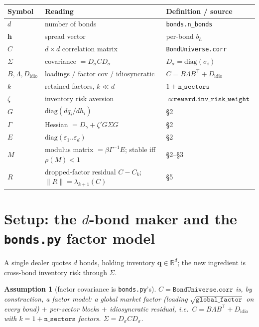 \documentclass[11pt]{article}
\newtheorem{assumption}{Assumption}
\newcommand{\eps}{\varepsilon}
\newcommand{\code}[1]{\texttt{#1}}
\newcommand{\Gam}{\Gamma}
\newcommand{\Sig}{\Sigma}
\newcommand{\Mmat}{M}
\newcommand{\diag}{\mathrm{diag}}
\newcommand{\bh}{\bm{h}}
\newcommand{\bq}{\bm{q}}
\begin{document}
\begin{center}
\begin{tabular}{@{}lll@{}}
\toprule
Symbol & Reading & Definition / source \\
\midrule
$d$ & number of bonds & \code{bonds.n\_bonds} \\
$\bh$ & spread vector & per-bond $b_h$ \\
$C$ & $d\times d$ correlation matrix & \code{BondUniverse.corr} \\
$\Sig$ & covariance $=D_\sigma C D_\sigma$ & $D_\sigma=\diag(\sigma_i)$ \\
$B,\Lambda,D_{\mathrm{idio}}$ & loadings / factor cov / idiosyncratic & $C=B\Lambda B^{\!\top}+D_{\mathrm{idio}}$ \\
$k$ & retained factors, $k\ll d$ & $1+\code{n\_sectors}$ \\
$\zeta$ & inventory risk aversion & $\propto\code{reward.inv\_risk\_weight}$ \\
$G$ & $\diag(dq_i/dh_i)$ & \S2 \\
$\Gam$ & Hessian $=D_\gamma+\zeta' G\Sig G$ & \S2 \\
$E$ & $\diag(\eps_1..\eps_d)$ & \S2 \\
$\Mmat$ & modulus matrix $=\beta\Gam^{-1}E$; stable iff $\rho(\Mmat)<1$ & \S2--\S3 \\
$R$ & dropped-factor residual $C-C_k$; $\|R\|=\lambda_{k+1}(C)$ & \S5 \\
\bottomrule
\end{tabular}
\end{center}

\section{Setup: the $d$-bond maker and the \code{bonds.py} factor model}

A single dealer quotes $d$ bonds, holding inventory $\bq\in\mathbb{R}^d$; the new
ingredient is cross-bond inventory risk through $\Sig$.

\begin{assumption}[factor covariance is \code{bonds.py}'s]
$C=\code{BondUniverse.corr}$ is, by construction, a factor model: a global market
factor (loading $\sqrt{\code{global\_factor}}$ on every bond) $+$ per-sector blocks
$+$ idiosyncratic residual, i.e.\ $C=B\Lambda B^{\!\top}+D_{\mathrm{idio}}$ with
$k=1+\code{n\_sectors}$ factors. $\Sig=D_\sigma C D_\sigma$.
\end{assumption}
\end{document}
